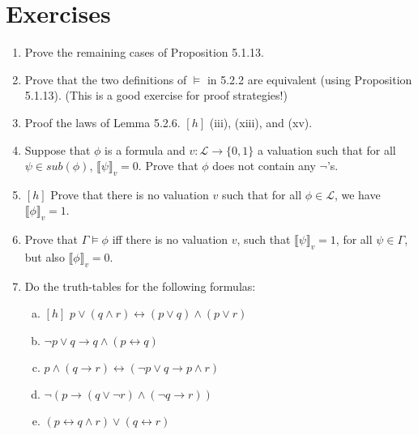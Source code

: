 \section{Exercises}


	\begin{enumerate}[\thesection.1]
	
		\item Prove the remaining cases of Proposition 5.1.13.
		
		\item Prove that the two definitions of $\vDash$ in 5.2.2 are equivalent (using Proposition 5.1.13). (This is a good exercise for proof strategies!)
		
		\item Proof the laws of Lemma 5.2.6. $[h]$ (iii), (xiii), and (xv).
		
		\item Suppose that $\phi$ is a formula and $v:\mathcal{L}\to\{0,1\}$ a valuation such that for all $\psi\in sub(\phi)$, $\llbracket\psi\rrbracket_v=0$. Prove that $\phi$ does not contain any $\neg$'s.
		
		\item $[h]$ Prove that there is no valuation $v$ such that for all $\phi\in\mathcal{L}$, we have $\llbracket\phi\rrbracket_v=1$.
		
		\item Prove that $\Gamma\vDash\phi$ iff there is no valuation $v$, such that $\llbracket\psi\rrbracket_v=1$, for all $\psi\in\Gamma$, but also $\llbracket\phi\rrbracket_v=0$.
		
		
		\item Do the truth-tables for the following formulas:
		
			\begin{enumerate}[(a)]
			
				
				\item$[h]$ $p \lor (q \land r) \leftrightarrow (p \lor q) \land(p \lor r)$
				
				\item $\neg p \lor q \rightarrow q \land (p \leftrightarrow q)$

				\item $p \land (q \rightarrow r) \leftrightarrow (\neg p \lor q \rightarrow  p \land r)$
				
				\item $\neg(p\rightarrow(q\lor \neg r)\land (\neg q\rightarrow r))$
				
				\item $(p\leftrightarrow q\land r)\lor(q\leftrightarrow r)$



\end{enumerate}
\end{enumerate}
